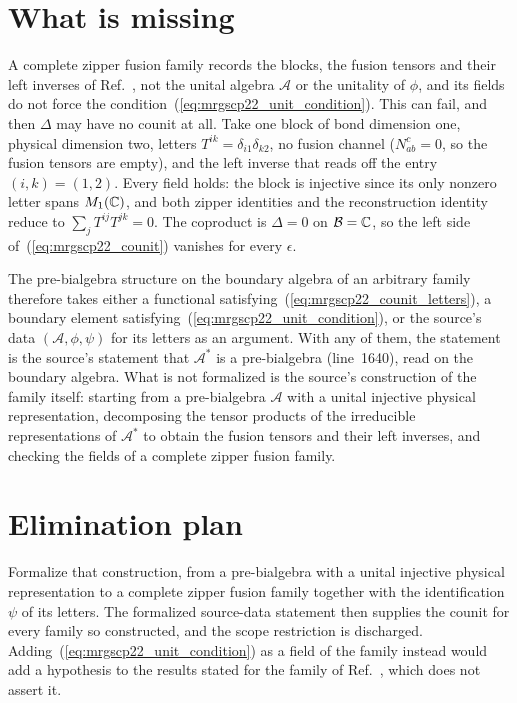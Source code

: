 \documentclass{article}
\begin{document}
\section{What is missing}

A complete zipper fusion family records the blocks, the fusion tensors and
their left inverses of Ref.~\cite{Bultinck2017Anyons}, not the unital
algebra $\mathcal A$ or the unitality of $\phi$, and its fields do not force
the condition~(\ref{eq:mrgscp22_unit_condition}).  This can fail, and then
$\Delta$ may have no counit at all.  Take one block
of bond dimension one, physical dimension two, letters
$T^{ik}=\delta_{i1}\delta_{k2}$, no fusion channel ($N^c_{ab}=0$, so the
fusion tensors are empty), and the left inverse that reads off the entry
$(i,k)=(1,2)$.  Every field holds: the block is injective since its only
nonzero letter spans $M_1(\mathbb{C})$, and both zipper identities and the
reconstruction identity reduce to $\sum_jT^{ij}T^{jk}=0$.  The coproduct is
$\Delta=0$ on $\mathcal B=\mathbb{C}$, so the left side of~(\ref{eq:mrgscp22_counit})
vanishes for every $\epsilon$.

The pre-bialgebra structure on the boundary algebra of an arbitrary family
therefore takes either a functional
satisfying~(\ref{eq:mrgscp22_counit_letters}), a boundary element
satisfying~(\ref{eq:mrgscp22_unit_condition}), or the source's data
$(\mathcal A,\phi,\psi)$ for its letters as an argument.  With any of them,
the statement is the source's statement that $\mathcal A^*$ is a
pre-bialgebra (line~1640), read on the boundary algebra.  What is not
formalized is the source's construction of the family itself: starting from
a pre-bialgebra $\mathcal A$ with a unital injective physical
representation, decomposing the tensor products of the irreducible
representations of $\mathcal A^*$ to obtain the fusion tensors and their
left inverses, and checking the fields of a complete zipper fusion family.

\section{Elimination plan}

Formalize that construction, from a pre-bialgebra with a unital injective
physical representation to a complete zipper fusion family together with
the identification $\psi$ of its letters.  The formalized source-data
statement then supplies the counit for every family so constructed, and the
scope restriction is discharged.  Adding~(\ref{eq:mrgscp22_unit_condition})
as a field of the family instead would add a hypothesis to the results
stated for the family of Ref.~\cite{Bultinck2017Anyons}, which does not
assert it.



\end{document}
